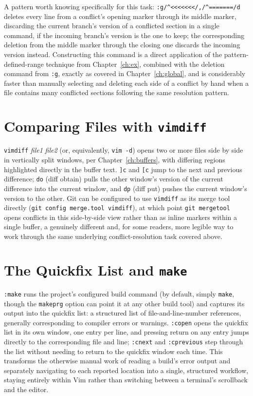 A pattern worth knowing specifically for this task: \texttt{:g/\textasciicircum<<<<<<</,/\textasciicircum=======/d} deletes every line from a conflict's opening marker through its middle marker, discarding the current branch's version of a conflicted section in a single command, if the incoming branch's version is the one to keep; the corresponding deletion from the middle marker through the closing one discards the incoming version instead. Constructing this command is a direct application of the pattern-defined-range technique from Chapter~\ref{ch:ex}, combined with the deletion command from \texttt{:g}, exactly as covered in Chapter~\ref{ch:global}, and is considerably faster than manually selecting and deleting each side of a conflict by hand when a file contains many conflicted sections following the same resolution pattern.

\section{Comparing Files with \texttt{vimdiff}}

\texttt{vimdiff} \textit{file1} \textit{file2} (or, equivalently, \texttt{vim -d}) opens two or more files side by side in vertically split windows, per Chapter~\ref{ch:buffers}, with differing regions highlighted directly in the buffer text. \texttt{]c} and \texttt{[c} jump to the next and previous difference; \texttt{do} (diff obtain) pulls the other window's version of the current difference into the current window, and \texttt{dp} (diff put) pushes the current window's version to the other. Git can be configured to use \texttt{vimdiff} as its merge tool directly (\texttt{git config merge.tool vimdiff}), at which point \texttt{git mergetool} opens conflicts in this side-by-side view rather than as inline markers within a single buffer, a genuinely different and, for some readers, more legible way to work through the same underlying conflict-resolution task covered above.

\section{The Quickfix List and \texttt{make}}

\texttt{:make} runs the project's configured build command (by default, simply \texttt{make}, though the \texttt{makeprg} option can point it at any other build tool) and captures its output into the quickfix list: a structured list of file-and-line-number references, generally corresponding to compiler errors or warnings. \texttt{:copen} opens the quickfix list in its own window, one entry per line, and pressing return on any entry jumps directly to the corresponding file and line; \texttt{:cnext} and \texttt{:cprevious} step through the list without needing to return to the quickfix window each time. This transforms the otherwise manual work of reading a build's error output and separately navigating to each reported location into a single, structured workflow, staying entirely within Vim rather than switching between a terminal's scrollback and the editor.

